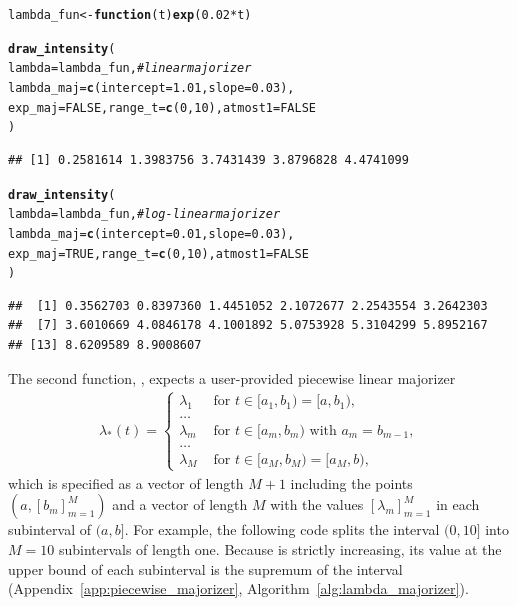 \documentclass[article,nojss]{jss}\usepackage[]{graphicx}\usepackage[]{xcolor}
\makeatletter
\newcommand{\hlnum}[1]{\textcolor[rgb]{0.686,0.059,0.569}{#1}}%
\newcommand{\hlcom}[1]{\textcolor[rgb]{0.678,0.584,0.686}{\textit{#1}}}%
\newcommand{\hlopt}[1]{\textcolor[rgb]{0,0,0}{#1}}%
\newcommand{\hlstd}[1]{\textcolor[rgb]{0.345,0.345,0.345}{#1}}%
\newcommand{\hlkwa}[1]{\textcolor[rgb]{0.161,0.373,0.58}{\textbf{#1}}}%
\newcommand{\hlkwb}[1]{\textcolor[rgb]{0.69,0.353,0.396}{#1}}%
\newcommand{\hlkwc}[1]{\textcolor[rgb]{0.333,0.667,0.333}{#1}}%
\newcommand{\hlkwd}[1]{\textcolor[rgb]{0.737,0.353,0.396}{\textbf{#1}}}%
\newenvironment{kframe}{%
 \def\at@end@of@kframe{}%
 \ifinner\ifhmode%
  \def\at@end@of@kframe{\end{minipage}}%
  \begin{minipage}{\columnwidth}%
 \fi\fi%
 \def\FrameCommand##1{\hskip\@totalleftmargin \hskip-\fboxsep
 \colorbox{shadecolor}{##1}\hskip-\fboxsep
     \hskip-\linewidth \hskip-\@totalleftmargin \hskip\columnwidth}%
 \MakeFramed {\advance\hsize-\width
   \@totalleftmargin\z@ \linewidth\hsize
   \@setminipage}}%
 {\par\unskip\endMakeFramed%
 \at@end@of@kframe}
\newenvironment{knitrout}{}{} %
\newcommand{\fct}[1]{\code{#1()}}
\makeatother
\begin{document}
\begin{knitrout}
\color{fgcolor}\begin{kframe}
\begin{alltt}
\hlstd{lambda_fun} \hlkwb{<-} \hlkwa{function}\hlstd{(}\hlkwc{t}\hlstd{)} \hlkwd{exp}\hlstd{(}\hlnum{0.02} \hlopt{*} \hlstd{t)}

\hlkwd{draw_intensity}\hlstd{(}
  \hlkwc{lambda} \hlstd{= lambda_fun,} \hlcom{# linear majorizer}
  \hlkwc{lambda_maj} \hlstd{=} \hlkwd{c}\hlstd{(}\hlkwc{intercept} \hlstd{=} \hlnum{1.01}\hlstd{,} \hlkwc{slope} \hlstd{=} \hlnum{0.03}\hlstd{),}
  \hlkwc{exp_maj} \hlstd{=} \hlnum{FALSE}\hlstd{,} \hlkwc{range_t} \hlstd{=} \hlkwd{c}\hlstd{(}\hlnum{0}\hlstd{,} \hlnum{10}\hlstd{),} \hlkwc{atmost1} \hlstd{=} \hlnum{FALSE}
\hlstd{)}
\end{alltt}
\begin{verbatim}
## [1] 0.2581614 1.3983756 3.7431439 3.8796828 4.4741099
\end{verbatim}
\begin{alltt}
\hlkwd{draw_intensity}\hlstd{(}
  \hlkwc{lambda} \hlstd{= lambda_fun,} \hlcom{# log-linear majorizer}
  \hlkwc{lambda_maj} \hlstd{=} \hlkwd{c}\hlstd{(}\hlkwc{intercept} \hlstd{=} \hlnum{0.01}\hlstd{,} \hlkwc{slope} \hlstd{=} \hlnum{0.03}\hlstd{),}
  \hlkwc{exp_maj} \hlstd{=} \hlnum{TRUE}\hlstd{,} \hlkwc{range_t} \hlstd{=} \hlkwd{c}\hlstd{(}\hlnum{0}\hlstd{,} \hlnum{10}\hlstd{),} \hlkwc{atmost1} \hlstd{=} \hlnum{FALSE}
\hlstd{)}
\end{alltt}
\begin{verbatim}
##  [1] 0.3562703 0.8397360 1.4451052 2.1072677 2.2543554 3.2642303
##  [7] 3.6010669 4.0846178 4.1001892 5.0753928 5.3104299 5.8952167
## [13] 8.6209589 8.9008607
\end{verbatim}
\end{kframe}
\end{knitrout}


The second function, \fct{draw\_intensity\_step}, expects a user-provided piecewise linear majorizer
\begin{align*}
    \lambda_*(t) = \begin{cases}
    \lambda_1 &\textrm{ for } t \in [a_1, b_1) = [a, b_1), \\
    \dots &\\
    \lambda_m &\textrm{ for } t \in [a_m, b_m) \textrm{ with } a_{m} = b_{m-1}, \\
    \dots &\\
    \lambda_M &\textrm{ for } t \in [a_M, b_M) = [a_M, b),
    \end{cases}
\end{align*}
which is specified as a vector of length $M+1$ including the points $(a, [b_m]_{m=1}^M)$ and a vector of length $M$ with the values $[\lambda_m]_{m=1}^M$ in each subinterval of $(a, b]$. For example, the following code splits the interval $(0, 10]$ into $M=10$ subintervals of length one. Because \fct{lambda\_fun} is strictly increasing, its value at the upper bound of each subinterval is the supremum of the interval (Appendix~\ref{app:piecewise_majorizer}, Algorithm~\ref{alg:lambda_majorizer}).
\end{document}
